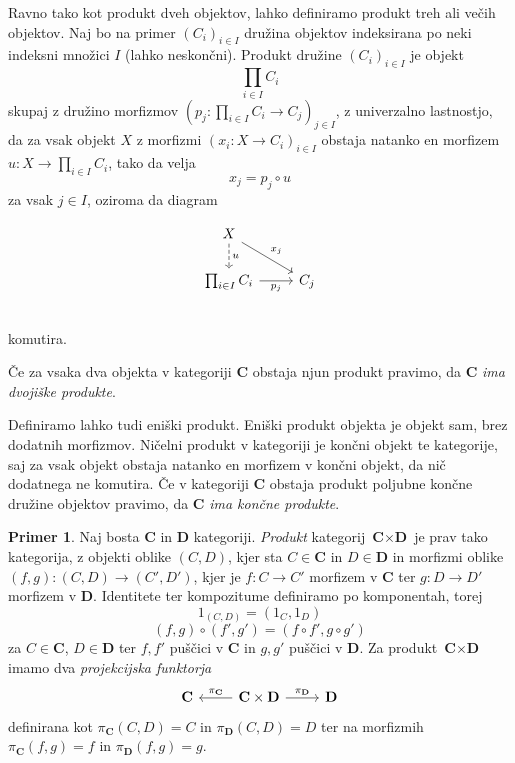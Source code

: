\documentclass[12pt,a4paper]{book}
\theoremstyle{definition}
\theoremstyle{plain}
\theoremstyle{definition}
\newtheorem{primer}{Primer}[section]
\theoremstyle{remark}
\newcommand{\cat}[1]{\textbf{#1}}
\begin{document}
Ravno tako kot produkt dveh objektov, lahko definiramo produkt treh ali večih objektov. Naj bo na primer $(C_i)_{i \in I}$ družina objektov indeksirana po neki indeksni množici $I$ (lahko neskončni). Produkt družine $(C_i)_{i \in I}$ je objekt
$$\prod_{i \in I}C_i$$
skupaj z družino morfizmov $(p_j : \prod_{i \in I}C_i \to C_j)_{j \in I}$, z univerzalno lastnostjo, da za vsak objekt $X$ z morfizmi $(x_i : X \to C_i)_{i \in I}$ obstaja natanko en morfizem $u : X \to \prod_{i \in I}C_i$, tako da velja $$x_j = p_j \circ u$$ za vsak $j \in I$, oziroma da diagram

$$\begin{tikzcd}
X \ar[d, dashed, "u"] \ar[dr, "x_j"] & \\
\prod_{i \in I}C_i \ar[r, "p_j"'] & C_j \\
\end{tikzcd}$$
komutira.

Če za vsaka dva objekta v kategoriji $\cat{C}$ obstaja njun produkt pravimo, da $\cat{C}$ \emph{ima dvojiške produkte}.

Definiramo lahko tudi eniški produkt. Eniški produkt objekta je objekt sam, brez dodatnih morfizmov. Ničelni produkt v kategoriji je končni objekt te kategorije, saj za vsak objekt obstaja natanko en morfizem v končni objekt, da nič dodatnega ne komutira. Če v kategoriji $\cat{C}$ obstaja produkt poljubne končne družine objektov pravimo, da $\cat{C}$ \emph{ima končne produkte}.

\begin{primer}
Naj bosta $\cat{C}$ in $\cat{D}$ kategoriji. \emph{Produkt} kategorij $\cat{C} \times \cat{D}$ je prav tako kategorija, z objekti oblike $(C,D)$, kjer sta $C \in \cat{C}$ in $D \in \cat{D}$ in morfizmi oblike $(f,g) : (C,D) \to (C',D')$, kjer je $f : C \to C'$ morfizem v $\cat{C}$ ter $g : D \to D'$ morfizem v $\cat{D}$. Identitete ter kompozitume definiramo po komponentah, torej
\begin{equation*}
1_{(C,D)} = (1_C,1_D)
\end{equation*}
\begin{equation*}
(f,g) \circ (f',g') = (f \circ f', g \circ g')
\end{equation*}
za $C \in \cat{C}$, $D \in \cat{D}$ ter $f,f'$ puščici v $\cat{C}$ in $g,g'$ puščici v $\cat{D}$.
Za produkt $\cat{C} \times \cat{D}$ imamo dva \textit{projekcijska funktorja} 
\[
\begin{tikzcd}
\cat{C} & \arrow[l, "\pi_{\cat{C}}"'] \cat{C} \times \cat{D} \arrow[r, "\pi_{\cat{D}}"] & \cat{D}
\end{tikzcd}
\]
definirana kot $\pi_{\cat{C}}(C,D) = C$ in $\pi_{\cat{D}}(C,D) = D$ ter na morfizmih $\pi_{\cat{C}}(f,g) = f$ in $\pi_{\cat{D}}(f,g) = g$.
\end{primer}
\end{document}
